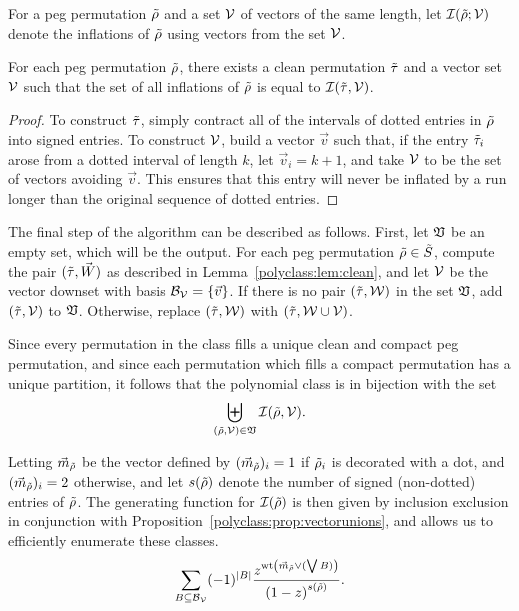     \begin{definition}\label{polyclass:def:restricted-inflations}
      For a peg permutation $\tilde{\rho}$ and a set $\mathcal{V}$ of vectors of the same
      length, let $\mathcal{I}(\tilde{\rho};\mathcal{V})$ denote the inflations of $\tilde{\rho}$ using vectors
      from the set $\mathcal{V}$. 
    \end{definition}

    \begin{lemma}\label{polyclass:lem:clean}
      For each peg permutation $\tilde{\rho}$, there exists a clean permutation $\tilde{\tau}$
      and a vector set $\mathcal{V}$ such that the set of all inflations of $\tilde{\rho}$ is equal
      to $\mathcal{I}(\tilde{\tau}, \mathcal{V})$. 
    \end{lemma}
    \begin{proof}
      To construct $\tilde{\tau}$, simply contract all of the intervals of dotted
      entries in $\tilde{\rho}$ into signed entries. To construct $\mathcal{V}$, build a vector
      $\vec v$ such that, if the entry $\tilde{\tau}_i$ arose from a dotted interval
      of length $k$, let $\vec v_i = k+1$, and take $\mathcal{V}$ to be the set of
      vectors avoiding $\vec v$.  This ensures that this entry will never be
      inflated by a run longer than the original sequence of dotted entries.
    \end{proof}

    The final step of the algorithm can be described as follows. First, let $\mathfrak{V}$ be
    an empty set, which will be the output. For each peg permutation $\tilde{\rho} \in \tilde{S}$, 
    compute the pair $(\tilde{\tau}, \vec W)$ as described in
    Lemma~\ref{polyclass:lem:clean}, and let $\mathcal{V}$ be the vector downset with
    basis $\mathcal{B}_{\mathcal{V}} = \{\vec v\}$. 
    If there is no pair $(\tilde{\tau}, \mathcal{W})$ in the
    set $\mathfrak{V}$, add $(\tilde{\tau}, \mathcal{V})$ to $\mathfrak{V}$. 
    Otherwise, replace $(\tilde{\tau}, \mathcal{W})$ with $(\tilde{\tau}, \mathcal{W} \cup \mathcal{V})$. 

    Since every permutation in the class fills a unique clean and compact
    peg permutation, and since each permutation which fills a compact
    permutation has a unique partition, it follows that the polynomial class is
    in bijection with the set 
    $$ \biguplus_{(\tilde{\rho},\mathcal{V}) \in \mathfrak{V}} \mathcal{I}(\tilde{\rho}, \mathcal{V}).$$

    Letting $\vec m_{\tilde{\rho}}$ be the vector defined by $(\vec m_{\tilde{\rho}})_i
    = 1$ if $\tilde{\rho}_i$ is decorated with a dot, and $(\vec m_{\tilde{\rho}})_i = 2$
    otherwise, and let $s(\tilde{\rho})$ denote the number of signed (non-dotted)
    entries of $\tilde{\rho}$. The generating function for $\mathcal{I}(\tilde{\rho})$ is then given by
    inclusion exclusion in conjunction with
    Proposition~\ref{polyclass:prop:vectorunions}, and allows us to efficiently
    enumerate these classes.  
    $$ \sum_{B \subseteq \cBV} (-1)^{|B|} 
        \frac{ z^{\wt \left( \vec m_{\tro} \vee (\bigvee B)\right)}}{%
        {(1-z)}^{ s( \tro ) } }.  $$




